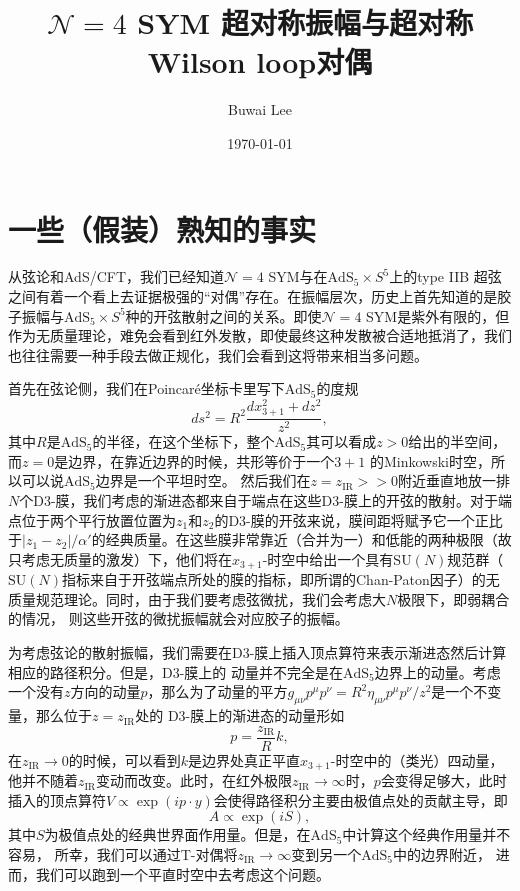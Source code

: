 \documentclass[10pt]{article}
\title{$\mathcal N=4$ SYM 超对称振幅与超对称Wilson loop对偶}
\author{Buwai Lee}
\date{\today}
\begin{document}
\maketitle %

\section{一些（假装）熟知的事实}

从弦论和AdS/CFT，我们已经知道$\mathcal N=4$ SYM与在$\text{AdS}_5\times S^5$上的type IIB 超弦之间有着一个看上去证据极强的“对偶”存在。在振幅层次，历史上首先知道的是胶子振幅与$\text{AdS}_5\times S^5$种的开弦散射之间的关系。即使$\mathcal N=4$ SYM是紫外有限的，但作为无质量理论，难免会看到红外发散，即使最终这种发散被合适地抵消了，我们也往往需要一种手段去做正规化，我们会看到这将带来相当多问题。

首先在弦论侧，我们在Poincar\'e坐标卡里写下$\text{AdS}_5$的度规
\[
	ds^2=R^2\frac{dx_{3+1}^2+dz^2}{z^2},
\]
其中$R$是$\text{AdS}_5$的半径，在这个坐标下，整个$\text{AdS}_5$其可以看成$z>0$给出的半空间，而$z=0$是边界，在靠近边界的时候，共形等价于一个$3+1$
的Minkowski时空，所以可以说$\text{AdS}_5$边界是一个平坦时空。
然后我们在$z=z_{\text{IR}}>\!\!> 0$附近垂直地放一排$N$个D3-膜，我们考虑的渐进态都来自于端点在这些D3-膜上的开弦的散射。对于端点位于两个平行放置位置为$z_1$和$z_2$的D3-膜的开弦来说，膜间距将赋予它一个正比于$|z_1-z_2|/\alpha'$的经典质量。在这些膜非常靠近（合并为一）和低能的两种极限（故只考虑无质量的激发）下，他们将在$x_{3+1}$-时空中给出一个具有$\text{SU}(N)$规范群（$\text{SU}(N)$指标来自于开弦端点所处的膜的指标，即所谓的Chan-Paton因子）的无质量规范理论。同时，由于我们要考虑弦微扰，我们会考虑大$N$极限下，即弱耦合的情况，
则这些开弦的微扰振幅就会对应胶子的振幅。

为考虑弦论的散射振幅，我们需要在D3-膜上插入顶点算符来表示渐进态然后计算相应的路径积分。但是，D3-膜上的
动量并不完全是在$\text{AdS}_5$边界上的动量。考虑一个没有$z$方向的动量$p$，那么为了动量的平方$g_{\mu\nu}p^\mu p^\nu=R^2\eta_{\mu\nu} p^\mu p^\nu/z^2$是一个不变量，那么位于$z=z_{\text{IR}}$处的
D3-膜上的渐进态的动量形如
\[
	p=\frac{z_{\text{IR}}}{R}k,
\]
在$z_{\text{IR}}\to 0$的时候，可以看到$k$是边界处真正平直$x_{3+1}$-时空中的（类光）四动量，他并不随着$z_{\text{IR}}$变动而改变。此时，在红外极限$z_{\text{IR}}\to \infty$时，$p$会变得足够大，此时插入的顶点算符$V\propto \exp(ip\cdot y)$会使得路径积分主要由极值点处的贡献主导，即
\[
	A\propto \exp(iS),
\]
其中$S$为极值点处的经典世界面作用量。但是，在$\text{AdS}_5$中计算这个经典作用量并不容易，
所幸，我们可以通过T-对偶将$z_{\text{IR}}\to \infty$变到另一个$\text{AdS}_5$中的边界附近，
进而，我们可以跑到一个平直时空中去考虑这个问题。
\end{document}
